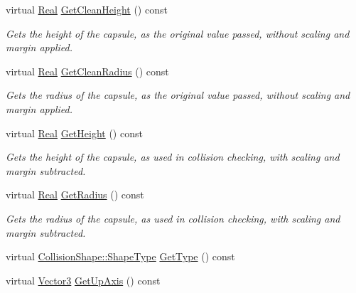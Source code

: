 \begin{DoxyCompactItemize}
\item 
virtual \hyperlink{namespaceMezzanine_a726731b1a7df72bf3583e4a97282c6f6}{Real} \hyperlink{classMezzanine_1_1CapsuleCollisionShape_a531d88a3599327c7ed2a038190fe73e3}{GetCleanHeight} () const 
\begin{DoxyCompactList}\small\item\em Gets the height of the capsule, as the original value passed, without scaling and margin applied. \item\end{DoxyCompactList}\item 
virtual \hyperlink{namespaceMezzanine_a726731b1a7df72bf3583e4a97282c6f6}{Real} \hyperlink{classMezzanine_1_1CapsuleCollisionShape_ad1a0ca094872f1e9f403475165cc455b}{GetCleanRadius} () const 
\begin{DoxyCompactList}\small\item\em Gets the radius of the capsule, as the original value passed, without scaling and margin applied. \item\end{DoxyCompactList}\item 
virtual \hyperlink{namespaceMezzanine_a726731b1a7df72bf3583e4a97282c6f6}{Real} \hyperlink{classMezzanine_1_1CapsuleCollisionShape_a8913f5ead449383b519a682fb837d6e2}{GetHeight} () const 
\begin{DoxyCompactList}\small\item\em Gets the height of the capsule, as used in collision checking, with scaling and margin subtracted. \item\end{DoxyCompactList}\item 
virtual \hyperlink{namespaceMezzanine_a726731b1a7df72bf3583e4a97282c6f6}{Real} \hyperlink{classMezzanine_1_1CapsuleCollisionShape_a2b49207a067b52d65bd0129711c7f85a}{GetRadius} () const 
\begin{DoxyCompactList}\small\item\em Gets the radius of the capsule, as used in collision checking, with scaling and margin subtracted. \item\end{DoxyCompactList}\item 
virtual \hyperlink{classMezzanine_1_1CollisionShape_ad04186055565998879b64176d6dd100d}{CollisionShape::ShapeType} \hyperlink{classMezzanine_1_1CapsuleCollisionShape_a2773853a924c2a97838546d96d851ba5}{GetType} () const 
\item 
virtual \hyperlink{classMezzanine_1_1Vector3}{Vector3} \hyperlink{classMezzanine_1_1CapsuleCollisionShape_a0e81e4ffde066d7673ea008024823644}{GetUpAxis} () const 

\end{DoxyCompactItemize}
